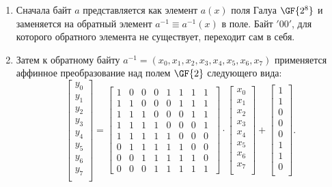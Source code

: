 \begin{enumerate}
    \item Сначала байт $a$ представляется как элемент $a(x)$ поля Галуа $\GF{2^8}$ и заменяется на обратный элемент $a^{-1} \equiv a^{-1}(x)$ в поле. Байт $\mathrm{'00'}$, для которого обратного элемента не существует, переходит сам в себя.
    \item Затем к обратному байту $a^{-1} = (x_0, x_1, x_2, x_3, x_4, x_5, x_6, x_7)$ применяется аффинное преобразование над полем $\GF{2}$ следующего вида:
        \[
            \left[  \begin{array}{c}
                y_{0} \\ y_{1} \\ y_{2} \\ y_{3} \\ y_{4} \\ y_{5} \\ y_{6} \\ y_{7} \\
            \end{array} \right] = \left[ \begin{array}{cccccccc}
                1 & 0 & 0  & 0 & 1 & 1 & 1 & 1 \\
                1 & 1 & 0  & 0 & 0 & 1 & 1 & 1 \\
                1 & 1 & 1  & 0 & 0 & 0 & 1 & 1 \\
                1 & 1 & 1  & 1 & 0 & 0 & 0 & 1 \\
                1 & 1 & 1  & 1 & 1 & 0 & 0 & 0 \\
                0 & 1 & 1  & 1 & 1 & 1 & 0 & 0 \\
                0 & 0 & 1  & 1 & 1 & 1 & 1 & 0 \\
                0 & 0 & 0  & 1 & 1 & 1 & 1 & 1  \
            \end{array} \right] \cdot \left[ \begin{array}{c}
                x_{0} \\ x_{1} \\ x_{2} \\ x_{3} \\ x_{4} \\ x_{5} \\ x_{6} \\ x_{7} \\
            \end{array} \right] + \left[ \begin{array}{c}
                1 \\ 1 \\ 0 \\ 0 \\ 0 \\ 1 \\ 1 \\ 0 \\
            \end{array} \right].
        \]
\end{enumerate}

